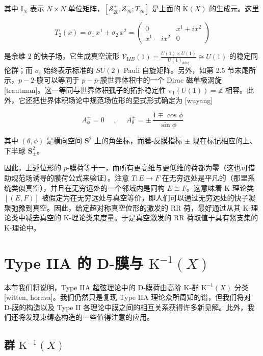 \documentclass[11pt,a4paper]{ctexart}
\newcommand{\SrcRange}[2]{\marginpar{\raggedright\footnotesize 原文 p.#1}}
\begin{document}
其中 \({\mathbb{I}}_N\) 表示 \(N\times N\) 单位矩阵，\([{\mathcal S}_{2k}^+,{\mathcal S}_{2k}^-;T_{2k}]\) 是上面的 \(\widetilde{{\mathrm K}}(X)\) 的生成元。这里

\[T_2(x)=\sigma_1\,x^1+\sigma_2\,x^2=
\left( \begin{array}{cc}0 & x^1+ix^2\\
x^1-ix^2&0
\end{array}\right)\]

是余维 2 的快子场，它生成真空流形 \({\mathcal V}_{\mathrm IIB}(1)=\frac{U(1)\times U(1)}{U(1)_{\mathrm diag}}\cong U(1)\) 的稳定同伦群；而 \(\sigma_i\) 始终表示标准的 \(SU(2)\) Pauli 自旋矩阵。另外，如第 2.5 节末尾所示，\(p-2\)-膜可以等同于 \(p-\overline{p}\)-膜世界体积中的一个 Dirac 磁单极涡旋 [trautman]。这一等同与世界体积孤子的拓扑稳定性 \(\pi_1(U(1))={\mathbb{Z}}\) 相容。此外，它还把世界体积场论中规范场位形的显式形式确定为 [wuyang]

\[A_\phi^\pm=0~~~~~~,~~~~~~A_\theta^\pm=\pm\,\frac{1\mp\cos\phi}{\sin\phi}\]

其中 \((\theta,\phi)\) 是横向空间 \({\mathbf S}^2\) 上的角坐标，而膜-反膜指标 \(\pm\) 现在标记相应的上、下半球 \({\mathbf S}_\pm^2\)。

因此，上述位形的 \(p\)-膜荷等于一，而所有更高维与更低维的荷都为零（这也可借助规范场诱导的膜荷公式来验证）。注意 \(T: E\rightarrow F\) 在无穷远处是平凡的（那里系统类似真空），并且在无穷远处的一个邻域内是同构 \(E\cong F\)。这意味着 K-理论类 \([(E,F)]\) 被假定为在无穷远处与真空等价，即人们可以通过无穷远处的快子凝聚弛豫到真空。因此，给定超对称真空位形的激发的 RR 荷，最好通过从其 K-理论类中减去真空的 K-理论类来度量。于是真空激发的 RR 荷取值于具有紧支集的 K-理论中。

\SrcRange{41}{41}
\section{\texorpdfstring{Type IIA 的 D-膜与 \({\mathrm K}^{-1}(X)\)}{Type IIA 的 D-膜与 \{\textbackslash mathrm K\}\^{}\{-1\}(X)}}\label{type-iia-ux7684-d-ux819cux4e0e-mathrm-k-1x}

本节我们将说明，Type IIA 超弦理论中的 D-膜荷由高阶 K-群 \({\mathrm K}^{-1}(X)\) 分类 [witten, horava]。我们仍然只是复现 Type IIA 理论众所周知的谱，但我们将对 D-膜的构造以及 Type II 各理论中膜之间的相互关系获得许多新见解。此外，我们还将发现束缚态构造的一些值得注意的应用。

\SrcRange{42}{42}
\subsection{\texorpdfstring{群 \({\mathrm K}^{-1}(X)\)}{群 \{\textbackslash mathrm K\}\^{}\{-1\}(X)}}\label{ux7fa4-mathrm-k-1x}
\end{document}

